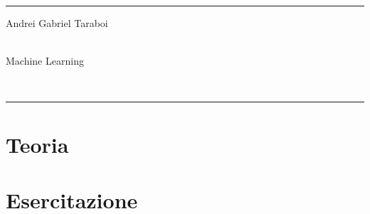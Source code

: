 \documentclass[a4paper]{article}
\begin{document}

\fancyhead[C]{}
\hrule \medskip %
\begin{minipage}{0.295\textwidth} 
\raggedright
\footnotesize
Andrei Gabriel Taraboi \hfill\\   
\hfill\\
\end{minipage}
\begin{minipage}{0.4\textwidth} 
\centering 
\large 
Machine Learning\\ 
\normalsize 
\end{minipage}
\begin{minipage}{0.295\textwidth} 
\raggedleft
\hfill\\
\end{minipage}
\medskip\hrule 
\bigskip

\tableofcontents

\newpage
\part{Teoria}










\setcounter{section}{0}
\newpage
\part{Esercitazione}





\end{document}
